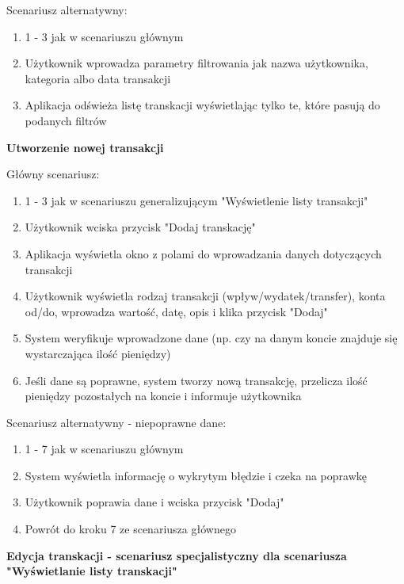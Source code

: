 Scenariusz alternatywny:

\begin{enumerate}
  \item 1 - 3 jak w scenariuszu głównym
  \item Użytkownik wprowadza parametry filtrowania jak nazwa użytkownika, kategoria albo data transakcji
  \item Aplikacja odświeża listę transkacji wyświetlając tylko te, które pasują do podanych filtrów
\end{enumerate}

\textbf{Utworzenie nowej transakcji}

Główny scenariusz:
\begin{enumerate}
  \item 1 - 3 jak w scenariuszu generalizującym "Wyświetlenie listy transakcji"
  \item Użytkownik wciska przycisk "Dodaj transkację"
  \item Aplikacja wyświetla okno z polami do wprowadzania danych dotyczących transakcji
  \item Użytkownik wyświetla rodzaj transakcji (wpływ/wydatek/transfer), konta od/do, wprowadza wartość, datę, opis i klika przycisk "Dodaj"
  \item System weryfikuje wprowadzone dane (np. czy na danym koncie znajduje się wystarczająca ilość pieniędzy)
  \item Jeśli dane są poprawne, system tworzy nową transakcję, przelicza ilość pieniędzy pozostałych na koncie i informuje użytkownika
\end{enumerate}

Scenariusz alternatywny - niepoprawne dane:
\begin{enumerate}
  \item 1 - 7 jak w scenariuszu głównym
  \item System wyświetla informację o wykrytym błędzie i czeka na poprawkę
  \item Użytkownik poprawia dane i wciska przycisk "Dodaj"
  \item Powrót do kroku 7 ze scenariusza głównego
\end{enumerate}

\textbf{Edycja transkacji - scenariusz specjalistyczny dla scenariusza "Wyświetlanie listy transkacji"}


